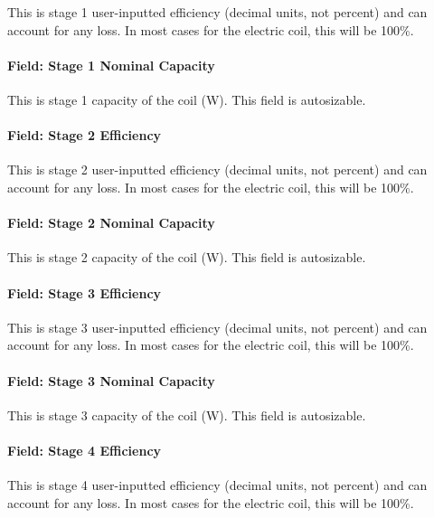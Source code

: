 This is stage 1 user-inputted efficiency (decimal units, not percent) and can account for any loss. In most cases for the electric coil, this will be 100\%.

\paragraph{Field: Stage 1 Nominal Capacity}\label{field-stage-1-nominal-capacity}

This is stage 1 capacity of the coil (W). This field is autosizable.

\paragraph{Field: Stage 2 Efficiency}\label{field-stage-2-efficiency}

This is stage 2 user-inputted efficiency (decimal units, not percent) and can account for any loss. In most cases for the electric coil, this will be 100\%.

\paragraph{Field: Stage 2 Nominal Capacity}\label{field-stage-2-nominal-capacity}

This is stage 2 capacity of the coil (W). This field is autosizable.

\paragraph{Field: Stage 3 Efficiency}\label{field-stage-3-efficiency}

This is stage 3 user-inputted efficiency (decimal units, not percent) and can account for any loss. In most cases for the electric coil, this will be 100\%.

\paragraph{Field: Stage 3 Nominal Capacity}\label{field-stage-3-nominal-capacity}

This is stage 3 capacity of the coil (W). This field is autosizable.

\paragraph{Field: Stage 4 Efficiency}\label{field-stage-4-efficiency}

This is stage 4 user-inputted efficiency (decimal units, not percent) and can account for any loss. In most cases for the electric coil, this will be 100\%.

